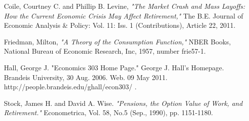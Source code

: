 \documentclass[12pt]{article}
\begin{document}
{\normalsize \singlespacing}\pagebreak \nolinebreak 

\begin{thebibliography}{9}
 Coile, Courtney C. and Phillip B. Levine, \textit{"The
Market Crash and Mass Layoffs: How the Current Economic Crisis May Affect
Retirement,"} The B.E. Journal of Economic Analysis \& Policy: Vol. 11: Iss.
1 (Contributions), Article 22, 2011. 

 Friedman, Milton, \textit{"A Theory of the Consumption
Function,"} NBER Books, National Bureau of Economic Research, Inc, 1957,
number frie57-1.

 Hall, George J. "Economics 303 Home Page." George J.
Hall's Homepage. Brandeis University, 30 Aug. 2006. Web. 09 May 2011. 
\TEXTsymbol{<}http://people.brandeis.edu/ghall/econ303/%
\TEXTsymbol{>}.

 Stock, James H. and David A. Wise. \textit{"Pensions, the
Option Value of Work, and Retirement."} Econometrica, Vol. 58, No.5 (Sep.,
1990), pp. 1151-1180.
\end{thebibliography}
\end{document}
